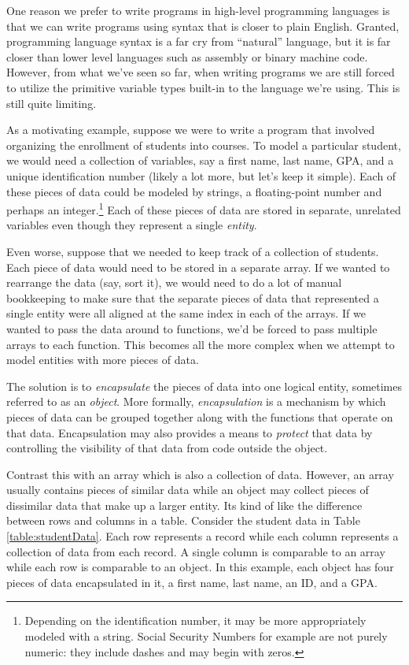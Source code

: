 

One reason we prefer to write programs in high-level programming
languages is that we can write programs using syntax that is closer 
to plain English.  Granted, programming language syntax is a far cry 
from ``natural'' language, but it is far closer than lower level 
languages such as assembly or binary machine code.  However, from
what we've seen so far, when writing programs we are still forced
to utilize the primitive variable types built-in to the language
we're using.  This is still quite limiting.

As a motivating example, suppose we were to write a program that
involved organizing the enrollment of students into courses.  To
model a particular student, we would need a collection of variables, 
say a first name, last name, GPA, and a unique identification number
(likely a lot more, but let's keep it simple).  Each of these
pieces of data could be modeled by strings, a floating-point number
and perhaps an integer.\footnote{Depending on the identification
number, it may be more appropriately modeled with a string.  Social
Security Numbers for example are not purely numeric: they include
dashes and may begin with zeros.}  Each of these pieces of 
data are stored in separate, unrelated variables even though they
represent a single \emph{entity}.  

Even worse, suppose that we needed to keep track of a collection
of students.  Each piece of data would need to be stored in 
a separate array.  If we wanted to rearrange the data (say, sort
it), we would need to do a lot of manual bookkeeping to make sure
that the separate pieces of data that represented a single entity
were all aligned at the same index in each of the arrays.  If we
wanted to pass the data around to functions, we'd be forced to
pass multiple arrays to each function.  This becomes all the more
complex when we attempt to model entities with more pieces of 
data.  

The solution is to \emph{encapsulate} the pieces of data into
one logical entity, sometimes referred to as an \emph{object}.  
More formally, \emph{encapsulation} is a mechanism by which
pieces of data can be grouped together along with the functions
that operate on that data.  Encapsulation may also provides a 
means to \emph{protect} that data by controlling the visibility
of that data from code outside the object.

Contrast this with an array which is also a collection of data.
However, an array usually contains pieces of similar data while
an object may collect pieces of dissimilar data that make up a
larger entity.  Its kind of like the difference between rows
and columns in a table.  Consider the student data in Table
\ref{table:studentData}.  Each row represents a record while each
column represents a collection of data from each record.  A
single column is comparable to an array while each row is comparable
to an object.  In this example, each object has four pieces of data
encapsulated in it, a first name, last name, an ID, and a GPA.

